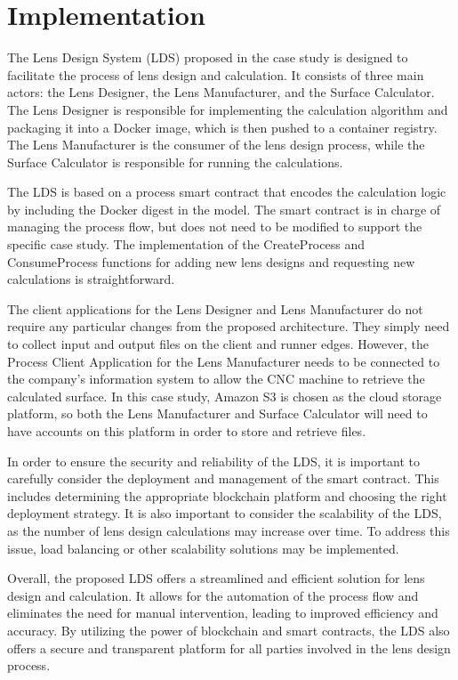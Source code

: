 \documentclass[10pt,a4paper]{report}
\begin{document}
\section{Implementation}
\large\justify The Lens Design System (LDS) proposed in the case study is designed to facilitate the process of lens design and calculation. It consists of three main actors: the Lens Designer, the Lens Manufacturer, and the Surface Calculator. The Lens Designer is responsible for implementing the calculation algorithm and packaging it into a Docker image, which is then pushed to a container registry. The Lens Manufacturer is the consumer of the lens design process, while the Surface Calculator is responsible for running the calculations.

\large\justify The LDS is based on a process smart contract that encodes the calculation logic by including the Docker digest in the model. The smart contract is in charge of managing the process flow, but does not need to be modified to support the specific case study. The implementation of the CreateProcess and ConsumeProcess functions for adding new lens designs and requesting new calculations is straightforward.

\large\justify The client applications for the Lens Designer and Lens Manufacturer do not require any particular changes from the proposed architecture. They simply need to collect input and output files on the client and runner edges. However, the Process Client Application for the Lens Manufacturer needs to be connected to the company's information system to allow the CNC machine to retrieve the calculated surface. In this case study, Amazon S3 is chosen as the cloud storage platform, so both the Lens Manufacturer and Surface Calculator will need to have accounts on this platform in order to store and retrieve files.

\large\justify In order to ensure the security and reliability of the LDS, it is important to carefully consider the deployment and management of the smart contract. This includes determining the appropriate blockchain platform and choosing the right deployment strategy. It is also important to consider the scalability of the LDS, as the number of lens design calculations may increase over time. To address this issue, load balancing or other scalability solutions may be implemented.

\large\justify Overall, the proposed LDS offers a streamlined and efficient solution for lens design and calculation. It allows for the automation of the process flow and eliminates the need for manual intervention, leading to improved efficiency and accuracy. By utilizing the power of blockchain and smart contracts, the LDS also offers a secure and transparent platform for all parties involved in the lens design process.
\end{document}
